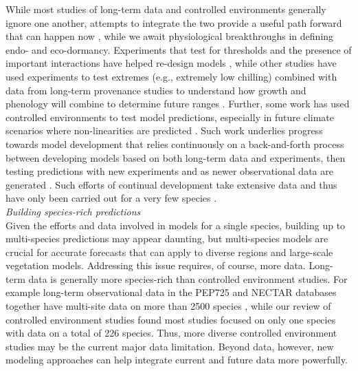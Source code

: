 \documentclass[11pt,letter]{article}
\begin{document}
While most studies of long-term data and controlled environments generally ignore one another, attempts to integrate the two provide a useful path forward that can happen now \citep{Caffarra:2011qf,nagano2012,satake2013,ford2016,chuinearees}, while we await physiological breakthroughs in defining endo- and eco-dormancy. Experiments that test for thresholds and the presence of important interactions have helped re-design models \citep{Caffarra:2011qf,chuinearees}, while other studies have used experiments to test extremes (e.g., extremely low chilling) combined with data from long-term provenance studies to understand how growth and phenology will combine to determine future ranges \citep{ford2016}. Further, some work has used controlled environments to test model predictions, especially in future climate scenarios where non-linearities are predicted \citep[see][]{nagano2012}. Such work underlies progress towards model development that relies continuously on a back-and-forth process between developing models based on both long-term data and experiments, then testing predictions with new experiments and as newer observational data are generated \citep[i.e., more years and also data from new locations,][]{nagano2012,satake2013}. Such efforts of continual development take extensive data and thus have only been carried out for a very few species \citep[e.g., \emph{Arabidopsis thaliana}, \emph{Oryza sativa} (rice), \emph{Arabidopsis halleri},][]{Wilczek:2009oa,nagano2012,satake2013}.\\

\emph{Building species-rich predictions}\\
Given the efforts and data involved in models for a single species, building up to multi-species predictions may appear daunting, but multi-species models are crucial for accurate forecasts that can apply to diverse regions and large-scale vegetation models. Addressing this issue requires, of course, more data. Long-term data is generally more species-rich than controlled environment studies. For example long-term observational data in the PEP725 and NECTAR databases together have multi-site data on more than 2500 species \citep{nectar,Templ2018}, while our review of controlled environment studies found most studies focused on only one species with data on a total of 226 species. Thus, more diverse controlled environment studies may be the current major data limitation. Beyond data, however, new modeling approaches can help integrate current and future data more powerfully. \\
\end{document}
